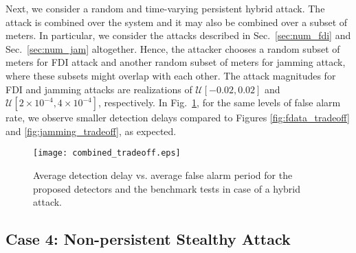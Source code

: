 \documentclass[onecolumn]{IEEEtran}
\begin{document}
Next, we consider a random and time-varying persistent hybrid attack. The attack is combined over the system and it may also be combined over a subset of meters. In particular, we consider the attacks described in Sec.~\ref{sec:num_fdi} and Sec.~\ref{sec:num_jam} altogether. Hence, the attacker chooses a random subset of meters for FDI attack and another random subset of meters for jamming attack, where these subsets might overlap with each other. The attack magnitudes for FDI and jamming attacks are realizations of $\mathcal{U}[-0.02,0.02]$ and $\mathcal{U}[2\times10^{-4},4\times10^{-4}]$, respectively. In Fig.~\ref{fig:combined_tradeoff}, for the same levels of false alarm rate, we observe smaller detection delays compared to Figures \ref{fig:fdata_tradeoff} and \ref{fig:jamming_tradeoff}, as expected.

\begin{figure}
\center
  \texttt{[image: combined\_tradeoff.eps]}
\caption{Average detection delay vs. average false alarm period for the proposed detectors and the benchmark tests in case of a hybrid attack.}
 \label{fig:combined_tradeoff}
\end{figure}


\subsection{Case 4: Non-persistent Stealthy Attack} \label{sec:nonper_st}
\end{document}
